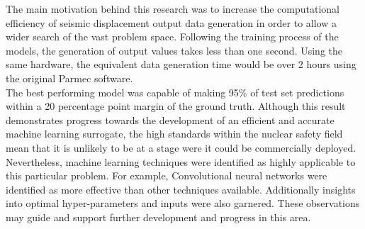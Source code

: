 \noindent
The main motivation behind this research was to increase the computational efficiency of seismic displacement output data generation in order to allow a wider search of the vast problem space. Following the training process of the models, the generation of output values takes less than one second. Using the same hardware, the equivalent data generation time would be over 2 hours using the original Parmec software.
\\

\noindent
The best performing model was capable of making 95\% of test set predictions within a 20 percentage point margin of the ground truth. Although this result demonstrates progress towards the development of an efficient and accurate machine learning surrogate, the high standards within the nuclear safety field mean that it is unlikely to be at a stage were it could be commercially deployed. Nevertheless, machine learning techniques were identified as highly applicable to this particular problem. For example, Convolutional neural networks were identified as more effective than other techniques available. Additionally insights into optimal hyper-parameters and inputs were also garnered. These observations may guide and support further development and progress in this area.



    
